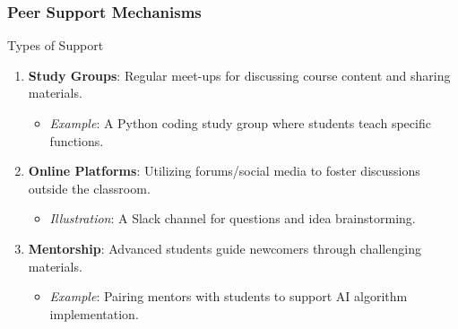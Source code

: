 \documentclass[aspectratio=169]{beamer}
\begin{document}
\begin{frame}[fragile]
    \frametitle{Peer Support Mechanisms}
    \begin{block}{Types of Support}
        \begin{enumerate}
            \item \textbf{Study Groups}: Regular meet-ups for discussing course content and sharing materials.
            \begin{itemize}
                \item \textit{Example}: A Python coding study group where students teach specific functions.
            \end{itemize}
            \item \textbf{Online Platforms}: Utilizing forums/social media to foster discussions outside the classroom.
            \begin{itemize}
                \item \textit{Illustration}: A Slack channel for questions and idea brainstorming.
            \end{itemize}
            \item \textbf{Mentorship}: Advanced students guide newcomers through challenging materials.
            \begin{itemize}
                \item \textit{Example}: Pairing mentors with students to support AI algorithm implementation.
            \end{itemize}
        \end{enumerate}
    \end{block}
\end{frame}
\end{document}
